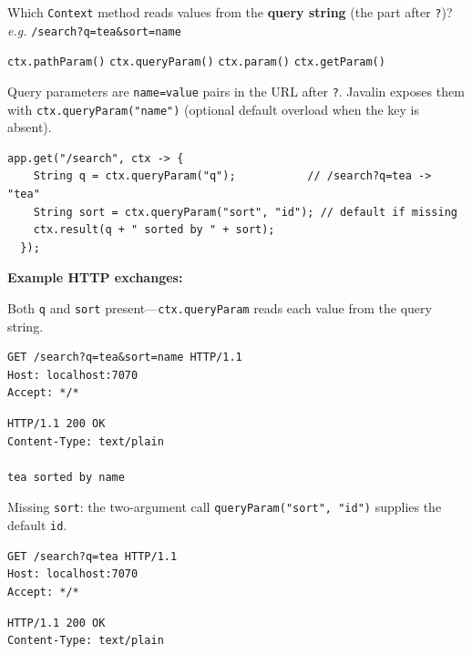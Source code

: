\question[4]
Which \texttt{Context} method reads values from the \textbf{query string} (the part after \texttt{?})? \\
\textit{e.g.} \texttt{/search?q=tea\&sort=name}
\begin{choices}
  \choice \texttt{ctx.pathParam()}
  \CorrectChoice \texttt{ctx.queryParam()}
  \choice \texttt{ctx.param()} 
  \choice \texttt{ctx.getParam()}
\end{choices}
\begin{solution}
  Query parameters are \texttt{name=value} pairs in the URL after \texttt{?}. Javalin exposes them with \texttt{ctx.queryParam("name")} (optional default overload when the key is absent).

  \begin{lstlisting}[style=java]
  app.get("/search", ctx -> {
    String q = ctx.queryParam("q");           // /search?q=tea -> "tea"
    String sort = ctx.queryParam("sort", "id"); // default if missing
    ctx.result(q + " sorted by " + sort);
  });
  \end{lstlisting}

  \noindent\textbf{Example HTTP exchanges:}\par
  \noindent Both \texttt{q} and \texttt{sort} present---\texttt{ctx.queryParam} reads each value from the query string.\par
  \begin{httpexchange}
\begin{lstlisting}[style=http]
GET /search?q=tea&sort=name HTTP/1.1
Host: localhost:7070
Accept: */*

\end{lstlisting}
\httpmidarrows
\begin{lstlisting}[style=http]
HTTP/1.1 200 OK
Content-Type: text/plain

tea sorted by name
\end{lstlisting}
  \end{httpexchange}

  \noindent Missing \texttt{sort}: the two-argument call \texttt{queryParam("sort", "id")} supplies the default \texttt{id}.\par
  \begin{httpexchange}
\begin{lstlisting}[style=http]
GET /search?q=tea HTTP/1.1
Host: localhost:7070
Accept: */*

\end{lstlisting}
\httpmidarrows
\begin{lstlisting}[style=http]
HTTP/1.1 200 OK
Content-Type: text/plain


\end{lstlisting}
\end{httpexchange}
\end{solution}
